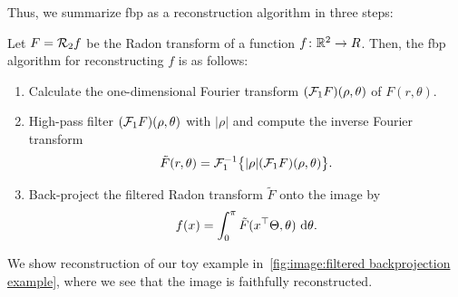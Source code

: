 \documentclass[../ml-ct.tex]{subfiles}
\begin{document}
Thus, we summarize \gls{fbp} as a reconstruction algorithm in three steps:
\begin{tcolorbox}[colback=lightgray]
	Let \( F = \mathcal{R}_2 f \) be the Radon transform of a function \( f\colon\mathbb{R}^2\to R \).
	Then, the \gls{fbp} algorithm for reconstructing \( f \) is as follows:
	\begin{enumerate}
		\item Calculate the one-dimensional Fourier transform \( (\mathcal{F}_1 F)(\rho, \theta) \) of \( F(r, \theta) \).
		\item High-pass filter \( (\mathcal{F}_1 F)(\rho, \theta) \) with \( |\rho| \) and compute the inverse Fourier transform \[ \tilde{F}(r, \theta) = \mathcal{F}_1^{-1} \big\{|\rho| (\mathcal{F}_1 F)(\rho, \theta)\big\}. \]
		\item Back-project the filtered Radon transform \( \tilde{F} \) onto the image by \[ f(x) = \int_0^\pi \tilde{F}(x^\top\Theta, \theta)\ \mathrm{d} \theta. \]
	\end{enumerate}
\end{tcolorbox}
We show reconstruction of our toy example in~\cref{fig:image:filtered backprojection example}, where we see that the image is faithfully reconstructed.
\end{document}
